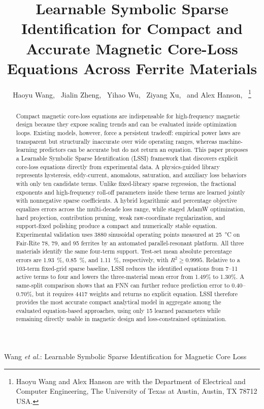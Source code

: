 \documentclass[lettersize,journal]{IEEEtran}
\begin{document}
\title{Learnable Symbolic Sparse Identification for Compact and Accurate Magnetic Core-Loss Equations Across Ferrite Materials}

\author{Haoyu Wang,~
Jialin Zheng,~
Yihao Wu,~
Ziyang Xu,~
and Alex Hanson,~%
\thanks{Haoyu Wang and Alex Hanson are with the Department of Electrical and Computer Engineering, The University of Texas at Austin, Austin, TX 78712 USA.}%
}

%
{Wang \MakeLowercase{\textit{et al.}}: Learnable Symbolic Sparse Identification for Magnetic Core Loss}

\maketitle

\begin{abstract}
Compact magnetic core-loss equations are indispensable for high-frequency magnetic design because they expose scaling trends and can be evaluated inside optimization loops. Existing models, however, force a persistent tradeoff: empirical power laws are transparent but structurally inaccurate over wide operating ranges, whereas machine-learning predictors can be accurate but do not return an equation. This paper proposes a Learnable Symbolic Sparse Identification (LSSI) framework that discovers explicit core-loss equations directly from experimental data. A physics-guided library represents hysteresis, eddy-current, anomalous, saturation, and auxiliary loss behaviors with only ten candidate terms. Unlike fixed-library sparse regression, the fractional exponents and high-frequency roll-off parameters inside these terms are learned jointly with nonnegative sparse coefficients. A hybrid logarithmic and percentage objective equalizes errors across the multi-decade loss range, while staged AdamW optimization, hard projection, contribution pruning, weak raw-coordinate regularization, and support-fixed polishing produce a compact and numerically stable equation. Experimental validation uses 3880 sinusoidal operating points measured at \SI{25}{\degreeCelsius} on Fair-Rite 78, 79, and 95 ferrites by an automated parallel-resonant platform. All three materials identify the same four-term support. Test-set mean absolute percentage errors are \SI{1.93}{\percent}, \SI{0.85}{\percent}, and \SI{1.11}{\percent}, respectively, with $R^2\geq0.9995$. Relative to a 103-term fixed-grid sparse baseline, LSSI reduces the identified equations from 7--11 active terms to four and lowers the three-material mean error from 1.49\% to 1.30\%. A same-split comparison shows that an FNN can further reduce prediction error to 0.40--0.70\%, but it requires 4417 weights and returns no explicit equation. LSSI therefore provides the most accurate compact analytical model in aggregate among the evaluated equation-based approaches, using only 15 learned parameters while remaining directly usable in magnetic design and loss-constrained optimization.
\end{abstract}
\end{document}
